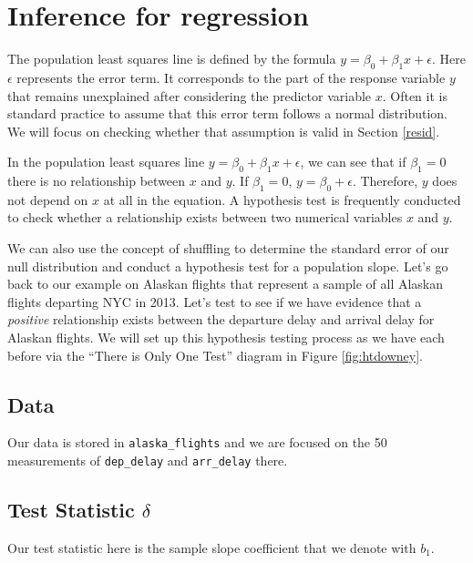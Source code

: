 \documentclass[]{tufte-book}
\theoremstyle{definition}
\theoremstyle{definition}
\theoremstyle{remark}
\begin{document}
\section{Inference for regression}\label{inference-for-regression}

The population least squares line is defined by the formula
\(y = \beta_0 + \beta_1 x + \epsilon\). Here \(\epsilon\) represents the
error term. It corresponds to the part of the response variable \(y\)
that remains unexplained after considering the predictor variable \(x\).
Often it is standard practice to assume that this error term follows a
normal distribution. We will focus on checking whether that assumption
is valid in Section \ref{resid}.

In the population least squares line
\(y = \beta_0 + \beta_1 x + \epsilon\), we can see that if
\(\beta_1 = 0\) there is no relationship between \(x\) and \(y\). If
\(\beta_1 = 0\), \(y = \beta_0 + \epsilon\). Therefore, \(y\) does not
depend on \(x\) at all in the equation. A hypothesis test is frequently
conducted to check whether a relationship exists between two numerical
variables \(x\) and \(y\).

We can also use the concept of shuffling to determine the standard error
of our null distribution and conduct a hypothesis test for a population
slope. Let's go back to our example on Alaskan flights that represent a
sample of all Alaskan flights departing NYC in 2013. Let's test to see
if we have evidence that a \emph{positive} relationship exists between
the departure delay and arrival delay for Alaskan flights. We will set
up this hypothesis testing process as we have each before via the
``There is Only One Test'' diagram in Figure \ref{fig:htdowney}.

\subsection{Data}\label{data-2}

Our data is stored in \texttt{alaska\_flights} and we are focused on the
50 measurements of \texttt{dep\_delay} and \texttt{arr\_delay} there.

\subsection{\texorpdfstring{Test Statistic
\(\delta\)}{Test Statistic \textbackslash{}delta}}\label{test-statistic-delta-2}

Our test statistic here is the sample slope coefficient that we denote
with \(b_1\).
\end{document}
